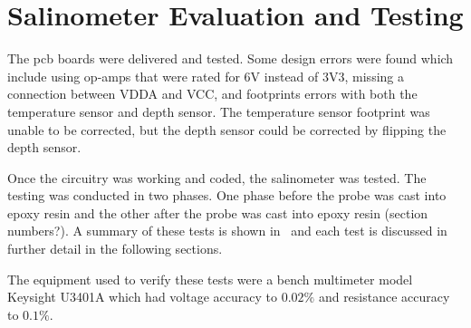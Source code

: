 
\chapter{Salinometer Evaluation and Testing}\label{ch:testing}

The \gls{pcb} boards were delivered and tested.
Some design errors were found which include using op-amps that were rated for 6V instead of 3V3, missing a connection between VDDA and VCC, and footprints errors with both the temperature sensor and depth sensor.
The temperature sensor footprint was unable to be corrected, but the depth sensor could be corrected by flipping the depth sensor.

Once the circuitry was working and coded, the salinometer was tested.
The testing was conducted in two phases.
One phase before the probe was cast into epoxy resin and the other after the probe was cast into epoxy resin (section numbers?).
A summary of these tests is shown in~ and each test is discussed in further detail in the following sections.

The equipment used to verify these tests were a bench multimeter model Keysight U3401A which had voltage accuracy to $0.02\%$ and resistance accuracy to $0.1\%$.

